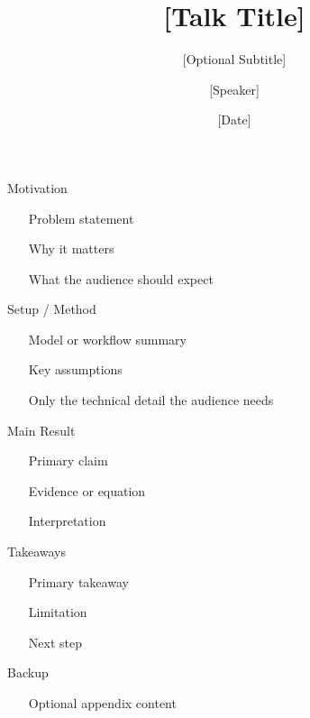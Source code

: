 \documentclass[professionalfonts]{beamer}
\title{[Talk Title]}
\subtitle{[Optional Subtitle]}
\author{[Speaker]}
\institute{[Affiliation]}
\date{[Date]}
\begin{document}
\begin{frame}
  \titlepage
\end{frame}

\begin{frame}{Motivation}
  \begin{itemize}
    \item [Problem statement]
    \item [Why it matters]
    \item [What the audience should expect]
  \end{itemize}
\end{frame}

\begin{frame}{Setup / Method}
  \begin{itemize}
    \item [Model or workflow summary]
    \item [Key assumptions]
    \item [Only the technical detail the audience needs]
  \end{itemize}
\end{frame}

\begin{frame}{Main Result}
  \begin{itemize}
    \item [Primary claim]
    \item [Evidence or equation]
    \item [Interpretation]
  \end{itemize}
\end{frame}

\begin{frame}{Takeaways}
  \begin{itemize}
    \item [Primary takeaway]
    \item [Limitation]
    \item [Next step]
  \end{itemize}
\end{frame}

\appendix

\begin{frame}{Backup}
  \begin{itemize}
    \item [Optional appendix content]
  \end{itemize}
\end{frame}
\end{document}
